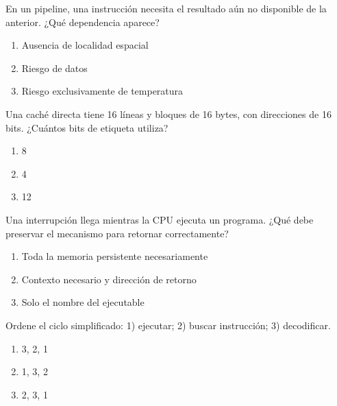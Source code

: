 \noindent\begin{minipage}{\linewidth}\setlength{\parskip}{4pt}\label{q:H-036}
En un pipeline, una instrucción necesita el resultado aún no disponible de la anterior. ¿Qué dependencia aparece?
\begin{enumerate}[label=\Alph*),nosep]
\item Ausencia de localidad espacial
\item Riesgo de datos
\item Riesgo exclusivamente de temperatura
\end{enumerate}\end{minipage}\par\medskip

\noindent\begin{minipage}{\linewidth}\setlength{\parskip}{4pt}\label{q:H-037}
Una caché directa tiene 16 líneas y bloques de 16 bytes, con direcciones de 16 bits. ¿Cuántos bits de etiqueta utiliza?
\begin{enumerate}[label=\Alph*),nosep]
\item 8
\item 4
\item 12
\end{enumerate}\end{minipage}\par\medskip

\noindent\begin{minipage}{\linewidth}\setlength{\parskip}{4pt}\label{q:H-038}
Una interrupción llega mientras la CPU ejecuta un programa. ¿Qué debe preservar el mecanismo para retornar correctamente?
\begin{enumerate}[label=\Alph*),nosep]
\item Toda la memoria persistente necesariamente
\item Contexto necesario y dirección de retorno
\item Solo el nombre del ejecutable
\end{enumerate}\end{minipage}\par\medskip

\noindent\begin{minipage}{\linewidth}\setlength{\parskip}{4pt}\label{q:H-039}
Ordene el ciclo simplificado: 1) ejecutar; 2) buscar instrucción; 3) decodificar.
\begin{enumerate}[label=\Alph*),nosep]
\item 3, 2, 1
\item 1, 3, 2
\item 2, 3, 1
\end{enumerate}\end{minipage}\par\medskip

